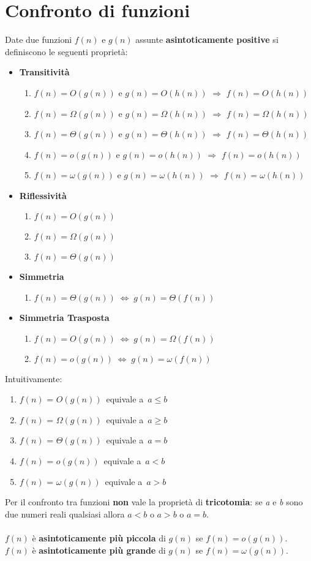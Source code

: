 \documentclass[10pt, a4paper]{report}
\begin{document}
\section{Confronto di funzioni}
Date due funzioni $f(n)$ e $g(n)$ assunte \textbf{asintoticamente positive} si definiscono le seguenti proprietà:
\begin{itemize}
\item[]\textbf{Transitività}
\begin{enumerate}
\item[] $f(n) = O(g(n))$ e $g(n) = O(h(n))$ \;$\Rightarrow$\; $f(n) = O(h(n))$
\item[] $f(n) = \Omega(g(n))$ e $g(n) = \Omega(h(n))$ \;$\Rightarrow$\; $f(n) = \Omega(h(n))$
\item[] $f(n) = \Theta(g(n))$ e $g(n) = \Theta(h(n))$ \;$\Rightarrow$\; $f(n) = \Theta(h(n))$
\item[] $f(n) = o(g(n))$ e $g(n) = o(h(n))$ \;$\Rightarrow$\; $f(n) = o(h(n))$
\item[] $f(n) = \omega(g(n))$ e $g(n) = \omega(h(n))$ \;$\Rightarrow$\; $f(n) = \omega(h(n))$
\end{enumerate}
\item[]\textbf{Riflessività}
\begin{enumerate}
\item[] $f(n) = O(g(n))$
\item[] $f(n) = \Omega(g(n))$
\item[] $f(n) = \Theta(g(n))$
\end{enumerate}
\item[]\textbf{Simmetria}
 \begin{enumerate}
 \item[] $f(n) = \Theta(g(n)) \;\Leftrightarrow\; g(n) = \Theta(f(n))$
 \end{enumerate}
\item[]\textbf{Simmetria Trasposta}
\begin{enumerate}
 \item[] $f(n) = O(g(n)) \;\Leftrightarrow\; g(n) = \Omega(f(n))$
\item[] $f(n) = o(g(n)) \;\Leftrightarrow\; g(n) = \omega(f(n))$
\end{enumerate}
\end{itemize}
Intuitivamente:
\begin{enumerate}
\item[] $f(n)$ = $O(g(n))$ \,equivale a\, $a \leq b$
\item[] $f(n)$ = $\Omega(g(n))$ \,equivale a\, $a \geq b$
\item[] $f(n)$ = $\Theta(g(n))$ \,equivale a\, $a = b$
\item[] $f(n)$ = $o(g(n))$ \,equivale a\, $a < b$
\item[] $f(n)$ = $\omega(g(n))$ \,equivale a\, $a > b$
\end{enumerate}
Per il confronto tra funzioni \textbf{non} vale la proprietà di \textbf{tricotomia}: se \textit{a} e \textit{b} sono due numeri reali qualsiasi allora $a < b$ o $a > b$ o $a = b$.\\\\
$f(n)$ è \textbf{asintoticamente più piccola} di $g(n)$ se $f(n) = o(g(n))$.\\
$f(n)$ è \textbf{asintoticamente più grande} di $g(n)$ se $f(n) = \omega(g(n))$.
\end{document}
